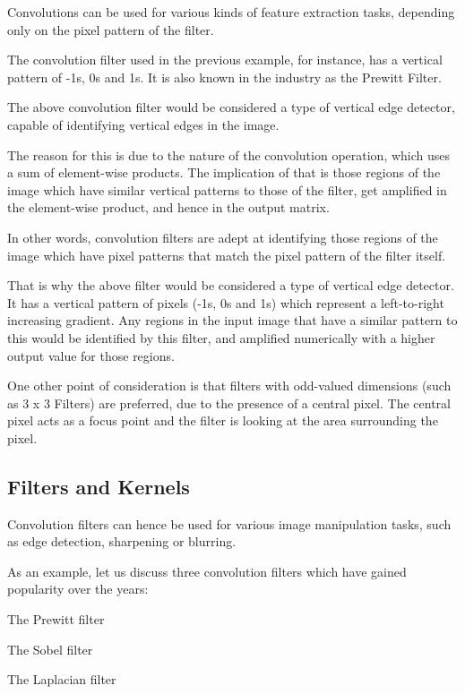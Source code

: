 	\begin{bulletedlist}
		\item Convolutions can be used for various kinds of feature extraction tasks, depending only on the pixel pattern of the filter.
		\item The convolution filter used in the previous example, for instance, has a vertical pattern of -1s, 0s and 1s.  It is also known in the industry as the Prewitt Filter.
		\item The above convolution filter would be considered a type of vertical edge detector, capable of identifying vertical edges in the image.
		\item The reason for this is due to the nature of the convolution operation, which uses a sum of element-wise products. The  implication of that is those regions of the image which have similar vertical patterns to those of the filter, get amplified in the element-wise product, and hence in the output matrix.
		\item In other words, convolution filters are adept at identifying those regions of the image which have pixel patterns that match the pixel pattern of the filter itself.
		\item That is why the above filter would be considered a type of vertical edge detector.  It has a vertical pattern of pixels (-1s, 0s and 1s) which represent a left-to-right increasing gradient.  Any regions in the input image that have a similar pattern to this would be identified by this filter, and amplified numerically with a higher output value for those regions.
		\item One other point of consideration is that filters with odd-valued dimensions (such as 3 x 3 Filters) are preferred, due to the presence of a central pixel.  The central pixel acts as a focus point and the filter is looking at the area surrounding the pixel.
	\end{bulletedlist}


	\subsection{Filters and Kernels}
	\begin{bulletedlist}
		\item Convolution filters can hence be used for various image manipulation tasks, such as edge detection, sharpening or blurring.
		\item As an example, let us discuss three convolution filters which have gained popularity over the years:
		\begin{bulletedlist}
			\item The Prewitt filter
			\item The Sobel filter
			\item The Laplacian filter
		\end{bulletedlist}
	\end{bulletedlist}

